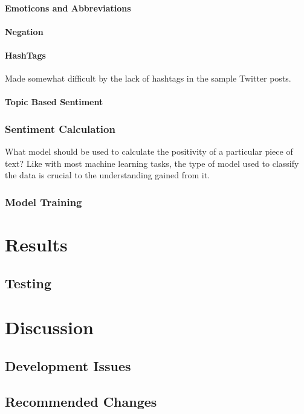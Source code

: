 \documentclass[12pt,twoside]{report}
\begin{document}
			\subsubsection{Emoticons and Abbreviations}
			\subsubsection{Negation}
			\subsubsection{HashTags}
			Made somewhat difficult by the lack of hashtags in the sample Twitter posts.
			\subsubsection{Topic Based Sentiment}
			
		\subsection{Sentiment Calculation}
		What model should be used to calculate the positivity of a particular piece of text? Like with most machine learning tasks, the type of model used to classify the data is crucial to the understanding gained from it.
		\subsection{Model Training}
\chapter{Results}
	\section{Testing}
\chapter{Discussion}
	\section{Development Issues}
	\section{Recommended Changes}
\end{document}

